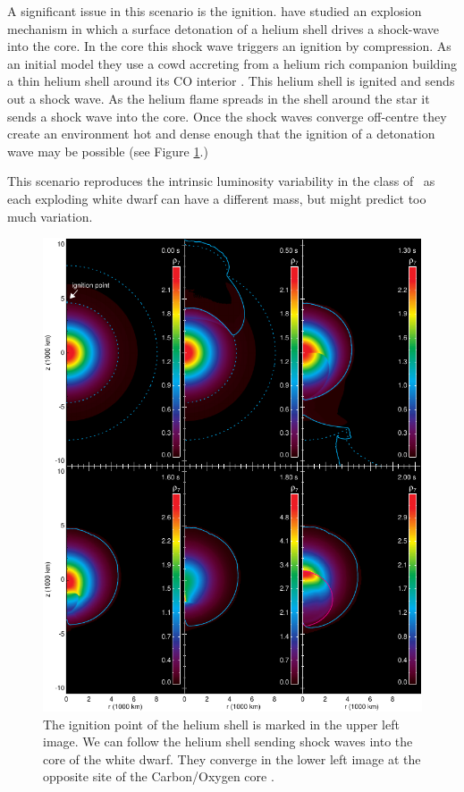 A significant issue in this scenario is the ignition. \cite{2010A&A...514A..53F} have studied an explosion mechanism in which a surface detonation of a helium shell drives a shock-wave into the core. In the core this shock wave triggers an ignition by compression.  As an initial model they use a \gls{cowd} accreting from a helium rich companion building a thin helium shell around its CO interior \citep[described in][]{2007ApJ...662L..95B}. This helium shell is ignited and sends out a shock wave. As the helium flame spreads in the shell around the star it sends a shock wave into the core. Once the shock waves converge off-centre they create an environment hot and dense enough that the ignition of a detonation wave may be possible (see Figure \ref{fig:subch_fink2010}.) 

This scenario reproduces the intrinsic luminosity variability in the class of \snia\ as each exploding white dwarf can have a different mass, but might predict too much variation. 

\begin{figure}[tb] %
   \centering
   \includegraphics[width=\textwidth]{chapter_intro/plots/fink2010.pdf} 
   \caption[Helium shell ignition leading to sub  detonation]{The ignition point of the helium shell is marked in the upper left image. We can follow the helium shell sending shock waves into the core of the white dwarf. They converge in the lower left image at the opposite site of the Carbon/Oxygen core \citep[data from][Figure kindly provided by Michael Fink]{2010A&A...514A..53F}. }
   \label{fig:subch_fink2010}
\end{figure}

